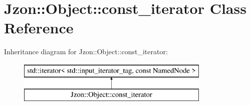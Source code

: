\hypertarget{class_jzon_1_1_object_1_1const__iterator}{\section{Jzon\-:\-:Object\-:\-:const\-\_\-iterator Class Reference}
\label{class_jzon_1_1_object_1_1const__iterator}
}
Inheritance diagram for Jzon\-:\-:Object\-:\-:const\-\_\-iterator\-:\begin{figure}[H]
\begin{center}
\leavevmode
\includegraphics[height=2.000000cm]{class_jzon_1_1_object_1_1const__iterator}
\end{center}
\end{figure}
